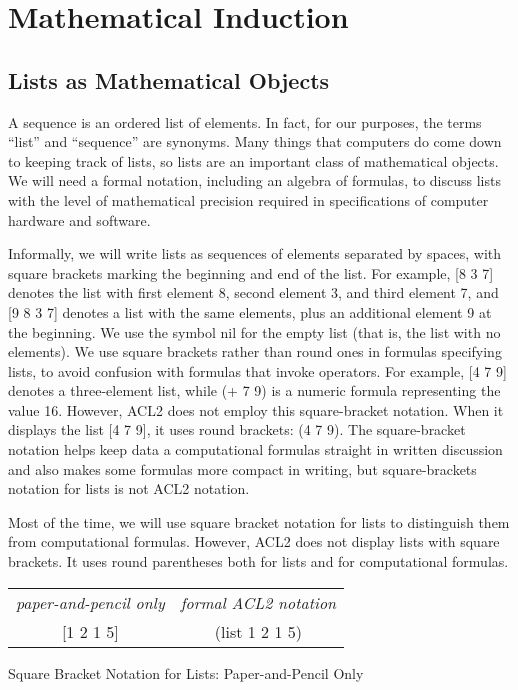 \chapter{Mathematical Induction}
\label{ch:mathematical-induction}

\section{Lists as Mathematical Objects}
\label{sec:lists-as-obj}
A sequence
is an ordered list of elements.
In fact, for our purposes, the terms ``list'' and ``sequence'' are synonyms.
Many things that computers do come down to keeping track of lists,
so lists are an important class of mathematical objects.
We will need a formal notation, including an algebra of formulas,
to discuss lists with the level of mathematical precision
required in specifications of computer hardware and software.

Informally, we will write lists as sequences of elements separated by spaces,
with square brackets marking the beginning and end of the list.
For example, \textsf{[8 3 7]} denotes the list with first element 8,
second element 3, and third element 7, and
\textsf{[9 8 3 7]} denotes a list with the same elements,
plus an additional element 9 at the beginning.
\label{nil-def}
We use the symbol \textsf{nil} for the empty list
(that is, the list with no elements).
\label{square-brackets}We use
square brackets
rather than round ones in formulas
specifying lists, to avoid confusion with formulas that invoke operators.
For example, \textsf{[4 7 9]} denotes a three-element list,
while \textsf{(+ 7 9)} is a numeric formula representing the value 16.
However, ACL2 does not employ this square-bracket notation.
When it displays the list \textsf{[4 7 9]},
it uses round brackets: \textsf{(4 7 9)}.
The square-bracket notation helps keep data a computational formulas
straight in written discussion and also makes some
formulas more compact in writing, but square-brackets 
notation for lists is not ACL2 notation.

\begin{aside}
Most of the time, we will use square bracket
notation for lists
to distinguish them from computational formulas.
However, ACL2 does not display lists with square brackets.
It uses round parentheses both for lists and for computational formulas.
\begin{center}
\vspace{1mm}
\begin{tabular}{cc}
 \emph{paper-and-pencil only} & \emph{formal ACL2 notation}\\
 \textsf{[1 2 1 5]}           & \textsf{(list 1 2 1 5)}\\
\end{tabular}
\end{center}
\caption{Square Bracket Notation for Lists: Paper-and-Pencil Only}
\label{square-bracket-notation}
\end{aside}

